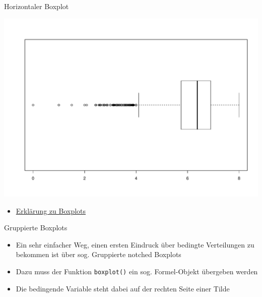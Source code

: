 \documentclass[ignorenonframetext,]{beamer}
\newenvironment{Shaded}{}{}
\newcommand{\KeywordTok}[1]{\textcolor[rgb]{0.00,0.44,0.13}{\textbf{{#1}}}}
\newcommand{\DataTypeTok}[1]{\textcolor[rgb]{0.56,0.13,0.00}{{#1}}}
\newcommand{\OtherTok}[1]{\textcolor[rgb]{0.00,0.44,0.13}{{#1}}}
\newcommand{\NormalTok}[1]{{#1}}
\providecommand{\tightlist}{%
\setlength{\itemsep}{0pt}\setlength{\parskip}{0pt}}
\begin{document}
\begin{frame}[fragile]{Horizontaler Boxplot}

\begin{Shaded}
\end{Shaded}

\includegraphics{R_intern_files/figure-beamer/unnamed-chunk-214-1.pdf}

\begin{itemize}
\tightlist
\item
  \href{http://edoc.hu-berlin.de/dissertationen/gruenwald-andreas-2005-01-17/HTML/chapter2.html}{Erklärung
  zu Boxplots}
\end{itemize}

\end{frame}

\begin{frame}[fragile]{Gruppierte Boxplots}

\begin{itemize}
\tightlist
\item
  Ein sehr einfacher Weg, einen ersten Eindruck über bedingte
  Verteilungen zu bekommen ist über sog. Gruppierte notched Boxplots
\item
  Dazu muss der Funktion \texttt{boxplot()} ein sog. Formel-Objekt
  übergeben werden
\item
  Die bedingende Variable steht dabei auf der rechten Seite einer Tilde
\end{itemize}

\end{frame}
\end{document}

